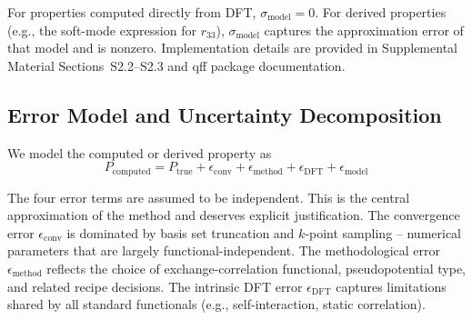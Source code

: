 \documentclass[prb,twocolumn,superscriptaddress,amsmath,amssymb,longbibliography]{revtex4-2}
\newcommand{\conv}{\mathrm{conv}}
\newcommand{\meth}{\mathrm{method}}
\begin{document}
For properties computed directly from DFT, 
$\sigma_{\mathrm{model}} = 0$. For derived properties (e.g., the soft-mode expression for $r_{33}$), 
$\sigma_{\mathrm{model}}$ captures the approximation error of that model 
and is nonzero. Implementation details are provided in Supplemental Material Sections~S2.2--S2.3 and qff package documentation. 

\subsection{Error Model and Uncertainty Decomposition}
\label{sec:decomposition}

We model the computed or derived property 
as \cite{JCGM2008_GUM}
\begin{equation}
    P_{\mathrm{computed}} = P_{\mathrm{true}} + \epsilon_\conv + \epsilon_\meth + \epsilon_{\mathrm{DFT}} + \epsilon_{\mathrm{model}}
    \label{eq:error_model}
\end{equation}

The four error terms are assumed to be independent. This is 
the central approximation of the method and deserves explicit 
justification. 
The convergence error $\epsilon_\conv$ is dominated by basis set truncation 
and $k$-point sampling -- numerical parameters that are largely 
functional-independent. The methodological error $\epsilon_\meth$ reflects 
the choice of exchange-correlation functional, pseudopotential type, and 
related recipe decisions. The intrinsic DFT error $\epsilon_{\mathrm{DFT}}$ 
captures limitations shared by all standard functionals (e.g., 
self-interaction, static correlation). 
\end{document}
